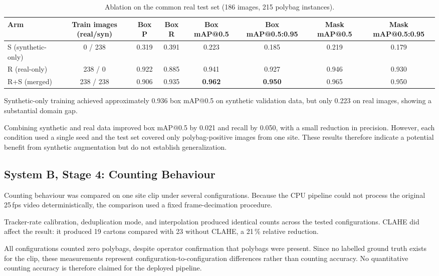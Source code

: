 \documentclass[9pt,a4paper,twocolumn]{rho-class/rho}
\begin{document}
\begin{table}[tbp]
    \caption{Ablation on the common real test set (186 images, 215 polybag instances).}
    \label{tab:t6}
    \centering
    \small
    \setlength{\tabcolsep}{3pt}
    \begin{tabular}{lccccccc}
    \toprule
    \textbf{Arm} & \textbf{Train images (real/syn)} & \textbf{Box P} & \textbf{Box R} & \textbf{Box mAP@0.5} & \textbf{Box mAP@0.5:0.95} & \textbf{Mask mAP@0.5} & \textbf{Mask mAP@0.5:0.95} \\
    \midrule
    S (synthetic-only) & 0 / 238 & 0.319 & 0.391 & 0.223 & 0.185 & 0.219 & 0.179 \\
    R (real-only) & 238 / 0 & 0.922 & 0.885 & 0.941 & 0.927 & 0.946 & 0.930 \\
    R+S (merged) & 238 / 238 & 0.906 & 0.935 & \textbf{0.962} & \textbf{0.950} & 0.965 & 0.950 \\
    \bottomrule
    \end{tabular}
\end{table}

Synthetic-only training achieved approximately 0.936 box mAP@0.5 on synthetic validation data, but only 0.223 on real images, showing a substantial domain gap.

Combining synthetic and real data improved box mAP@0.5 by 0.021 and recall by 0.050, with a small reduction in precision. However, each condition used a single seed and the test set covered only polybag-positive images from one site. These results therefore indicate a potential benefit from synthetic augmentation but do not establish generalization.

\subsection{System B, Stage 4: Counting Behaviour}

Counting behaviour was compared on one site clip under several configurations. Because the CPU pipeline could not process the original 25\,fps video deterministically, the comparison used a fixed frame-decimation procedure.

Tracker-rate calibration, deduplication mode, and interpolation produced identical counts across the tested configurations. CLAHE did affect the result: it produced 19 cartons compared with 23 without CLAHE, a 21\,\% relative reduction.

All configurations counted zero polybags, despite operator confirmation that polybags were present. Since no labelled ground truth exists for the clip, these measurements represent configuration-to-configuration differences rather than counting accuracy. No quantitative counting accuracy is therefore claimed for the deployed pipeline.
\end{document}
